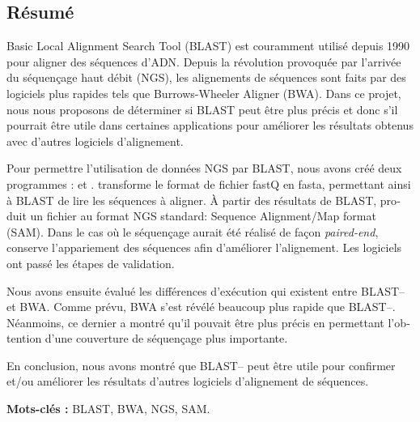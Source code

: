 \begin{otherlanguage}{french}
\chapter*{Résumé}
\frenchspacing

Basic Local Alignment Search Tool (BLAST) est couramment utilisé depuis 1990 pour aligner des séquences d'ADN\@.
Depuis la révolution provoquée par l'arrivée du séquençage haut débit (NGS), les alignements de séquences sont faits par des logiciels plus rapides tels que Burrows-Wheeler Aligner (BWA).
Dans ce projet, nous nous proposons de déterminer si BLAST peut être plus précis et donc s'il pourrait être utile dans certaines applications pour améliorer les résultats obtenus avec d'autres logiciels d'alignement.

Pour permettre l'utilisation de données NGS par BLAST, nous avons créé deux programmes : \fastqtofasta{} et \blastobam{}.
\fastqtofasta{} transforme le format de fichier fastQ en fasta, permettant ainsi à BLAST de lire les séquences à aligner.
À partir des résultats de BLAST, \blastobam{} produit un fichier au format NGS standard: Sequence Alignment\slash\hspace{0pt}Map format (SAM).
Dans le cas où le séquençage aurait été réalisé de façon \emph{paired-end}, \blastobam{} conserve l'appariement des séquences afin d'améliorer l'alignement.
Les logiciels ont passé les étapes de validation.

Nous avons ensuite évalué les différences d'exécution qui existent entre BLAST--\blastobam{} et BWA\@.
Comme prévu, BWA s'est révélé beaucoup plus rapide que BLAST--\blastobam{}.
Néanmoins, ce dernier a montré qu'il pouvait être plus précis en permettant l'obtention d'une couverture de séquençage plus importante.

En conclusion, nous avons montré que BLAST--\blastobam{} peut être utile pour confirmer et\slash\hspace{0pt}ou améliorer les résultats d'autres logiciels d'alignement de séquences.
\bigskip

\textbf{Mots-clés :} BLAST, BWA, NGS, SAM\@.
\nonfrenchspacing
\end{otherlanguage}
